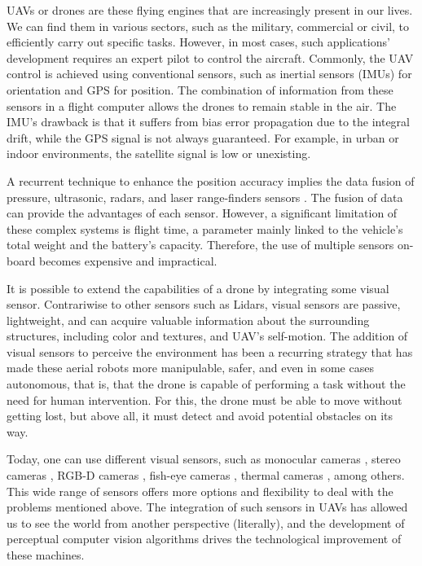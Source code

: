 UAVs or drones are these flying engines that are increasingly present in our lives. We can find them in various sectors, such as the military, commercial or civil, to efficiently carry out specific tasks. However, in most cases, such applications' development requires an expert pilot to control the aircraft. Commonly, the UAV control is achieved using conventional sensors, such as inertial sensors (IMUs) for orientation and GPS for position. The combination of information from these sensors in a flight computer allows the drones to remain stable in the air. The IMU's drawback is that it suffers from bias error propagation due to the integral drift, while the GPS signal is not always guaranteed. For example, in urban or indoor environments, the satellite signal is low or unexisting.

A recurrent technique to enhance the position accuracy implies the data fusion of pressure, ultrasonic, radars, and laser range-finders sensors \citep{Tomic.Schmid.ea:IRAM:2012}. The fusion of data can provide the advantages of each sensor. However, a significant limitation of these complex systems is flight time, a parameter mainly linked to the vehicle's total weight and the battery's capacity. Therefore, the use of multiple sensors on-board becomes expensive and impractical.

It is possible to extend the capabilities of a drone by integrating some visual sensor. Contrariwise to other sensors such as Lidars, visual sensors are passive, lightweight, and can acquire valuable information about the surrounding structures, including color and textures, and UAV's self-motion. The addition of visual sensors to perceive the environment has been a recurring strategy that has made these aerial robots more manipulable, safer, and even in some cases autonomous, that is, that the drone is capable of performing a task without the need for human intervention. For this, the drone must be able to move without getting lost, but above all, it must detect and avoid potential obstacles on its way. 

Today, one can use different visual sensors, such as monocular cameras \citep{Padhy.Xia.ea:TSC:2018}, stereo cameras \citep{Seitz.Curless.ea:CVPR:2006}, RGB-D cameras \citep{Huang.Bachrach.ea:RobR:2017}, fish-eye cameras \citep{Hrabar.Sukhatme:IROS:2004}, thermal cameras \citep{Gaszczak.Breckon.ea:IRCV:2011}, among others. This wide range of sensors offers more options and flexibility to deal with the problems mentioned above. The integration of such sensors in UAVs has allowed us to see the world from another perspective (literally), and the development of perceptual computer vision algorithms drives the technological improvement of these machines.

